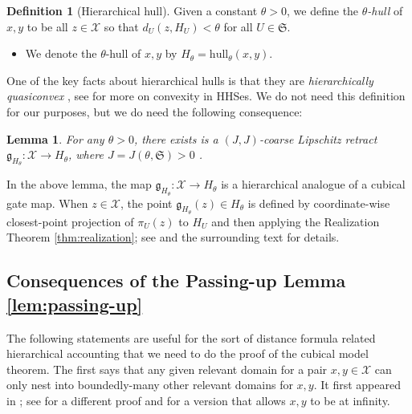 \documentclass{amsart}
\newtheorem{lemma}[theorem]{Lemma}
\theoremstyle{definition}
\newtheorem{definition}[theorem]{Definition}
\theoremstyle{remark}
\theoremstyle{definition}
\newcommand{\calX}{\mathcal{X}}
\newcommand{\hull}{\mathrm{hull}}
\newcommand{\gate}{\mathfrak{g}}
\begin{document}
\begin{definition}[Hierarchical hull]\label{defn:hier hull}
Given a constant $\theta>0$, we define the \emph{$\theta$-hull} of $x,y$ to be all $z \in \calX$ so that $d_U(z, H_U)<\theta$ for all $U \in \mathfrak S$.
\begin{itemize}
\item We denote the $\theta$-hull of $x,y$ by $H_{\theta} = \hull_{\theta}(x,y)$.
\end{itemize}
\end{definition}

One of the key facts about hierarchical hulls is that they are \emph{hierarchically quasiconvex} \cite[Lemma 6.2]{HHS_II}, see \cite{russell2023convexity} for more on convexity in HHSes.  We do not need this definition for our purposes, but we do need the following consequence:

\begin{lemma}\label{lem:gate retract}
For any $\theta>0$, there exists is a $(J,J)$-coarse Lipschitz retract $\gate_{H_{\theta}}:\calX \to H_{\theta}$, where $J = J(\theta, \mathfrak S)>0$ .
\end{lemma}

In the above lemma, the map $\gate_{H_{\theta}}: \calX \to H_{\theta}$ is a hierarchical analogue of a cubical gate map.  When $z \in \calX$, the point $\gate_{H_{\theta}}(z) \in H_{\theta}$ is defined by coordinate-wise closest-point projection of $\pi_U(z)$ to $H_U$ and then applying the Realization Theorem \ref{thm:realization}; see \cite[Proposition 6.3]{HHS_II} and the surrounding text for details.







\subsection{Consequences of the Passing-up Lemma \ref{lem:passing-up}}

The following statements are useful for the sort of distance formula related hierarchical accounting that we need to do the proof of the cubical model theorem.  The first says that any given relevant domain for a pair $x,y \in \calX$ can only nest into boundedly-many other relevant domains for $x,y$.  It first appeared in \cite[Lemma 2.15]{DMS_bary}; see \cite[Lemma 11.13]{CRHK} for a different proof and \cite[Lemma 4.8]{Dur_infcube} for a version that allows $x,y$ to be at infinity.
\end{document}
